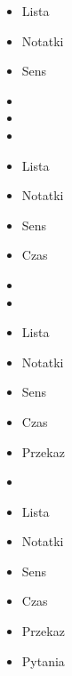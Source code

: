 \documentclass{beamer}
\begin{document}
\begin{frame}{}
	\begin{Large}
		\begin{itemize}
			\item Lista
			\item Notatki
			\item Sens
			\item 
			\item 
			\item 
		\end{itemize}
	\end{Large}
\end{frame}

\begin{frame}{}
	\begin{Large}
		\begin{itemize}
			\item Lista
			\item Notatki
			\item Sens
			\item Czas
			\item 
			\item 
		\end{itemize}
	\end{Large}
\end{frame}

\begin{frame}{}
	\begin{Large}
		\begin{itemize}
			\item Lista
			\item Notatki
			\item Sens
			\item Czas
			\item Przekaz
			\item 
		\end{itemize}
	\end{Large}
\end{frame}

\begin{frame}{}
	\begin{Large}
		\begin{itemize}
			\item Lista
			\item Notatki
			\item Sens
			\item Czas
			\item Przekaz
			\item Pytania
		\end{itemize}
	\end{Large}
\end{frame}
\end{document}
